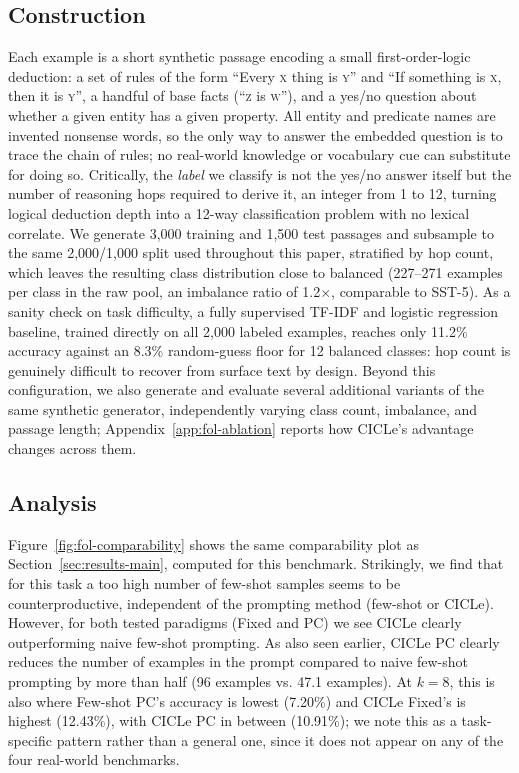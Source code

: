 \documentclass[runningheads]{llncs}
\begin{document}
\subsection{Construction}
Each example is a short synthetic passage encoding a small first-order-logic
deduction: a set of rules of the form ``Every \textsc{x} thing is
\textsc{y}'' and ``If something is \textsc{x}, then it is \textsc{y}'',
a handful of base facts (``\textsc{z} is \textsc{w}''), and a yes/no
question about whether a given entity has a given property. All entity
and predicate names are invented nonsense words, so the only way to answer
the embedded question is to trace the chain of rules; no real-world
knowledge or vocabulary cue can substitute for doing so. Critically, the
\emph{label} we classify is not the yes/no answer itself but the number
of reasoning hops required to derive it, an integer from 1 to 12, turning
logical deduction depth into a 12-way classification problem with no
lexical correlate. We generate 3,000 training and 1,500 test passages and
subsample to the same 2,000/1,000 split used throughout this paper,
stratified by hop count, which leaves the resulting class distribution
close to balanced (227--271 examples per class in the raw pool, an
imbalance ratio of 1.2$\times$, comparable to SST-5). As a sanity check on
task difficulty, a fully supervised TF-IDF and logistic regression
baseline, trained directly on all 2,000 labeled examples, reaches only
11.2\% accuracy against an 8.3\% random-guess floor for 12 balanced
classes: hop count is genuinely difficult to recover from surface text by
design. Beyond this configuration, we also generate and evaluate
several additional variants of the same synthetic generator, independently
varying class count, imbalance, and passage length;
Appendix~\ref{app:fol-ablation} reports how CICLe's advantage changes
across them.

\subsection{Analysis}
Figure~\ref{fig:fol-comparability} shows the same comparability
plot as Section~\ref{sec:results-main}, computed for this benchmark.
Strikingly, we find that for this task a too high number of few-shot samples seems to be counterproductive, independent of the prompting method (few-shot or CICLe). However, for both tested paradigms (Fixed and PC) we see CICLe clearly outperforming naive few-shot prompting. As also seen earlier, CICLe PC clearly reduces the number of examples in the prompt compared to naive few-shot prompting by more than half (96 examples vs. 47.1 examples). At $k{=}8$, this is also where Few-shot PC's accuracy is lowest (7.20\%) and CICLe Fixed's is highest (12.43\%), with CICLe PC in between (10.91\%); we note this as a task-specific pattern rather than a general one, since it does not appear on any of the four real-world benchmarks.
\end{document}
